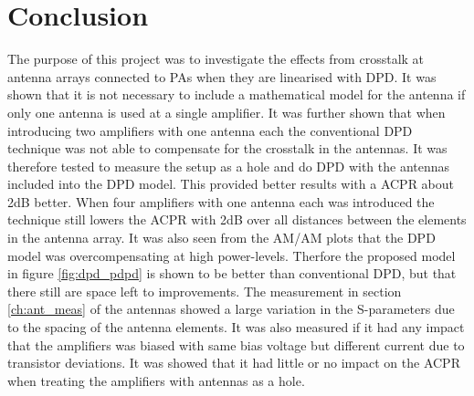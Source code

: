 \chapter{Conclusion}\label{ch:conclusion}
The purpose of this project was to investigate the effects from crosstalk at antenna arrays connected to PAs when they are linearised with DPD. It was shown that it is not necessary to include a mathematical model for the antenna if only one antenna is used at a single amplifier. It was further shown that when introducing two amplifiers with one antenna each the conventional DPD technique was not able to compensate for the crosstalk in the antennas. It was therefore tested to measure the setup as a hole and do DPD with the antennas included into the DPD model. This provided better results with a ACPR about 2dB better. When four amplifiers with one antenna each was introduced the technique still lowers the ACPR with 2dB over all distances between the elements in the antenna array. It was also seen from the AM/AM plots that the DPD model was overcompensating at high power-levels. Therfore the proposed model in figure \ref{fig:dpd_pdpd} is shown to be better than conventional DPD, but that there still are space left to improvements. The measurement in section \ref{ch:ant_meas} of the antennas showed a large variation in the S-parameters due to the spacing of the antenna elements. It was also measured if it had any impact that the amplifiers was biased with same bias voltage but different current due to transistor deviations. It was showed that it had little or no impact on the ACPR when treating the amplifiers with antennas as a hole.     




